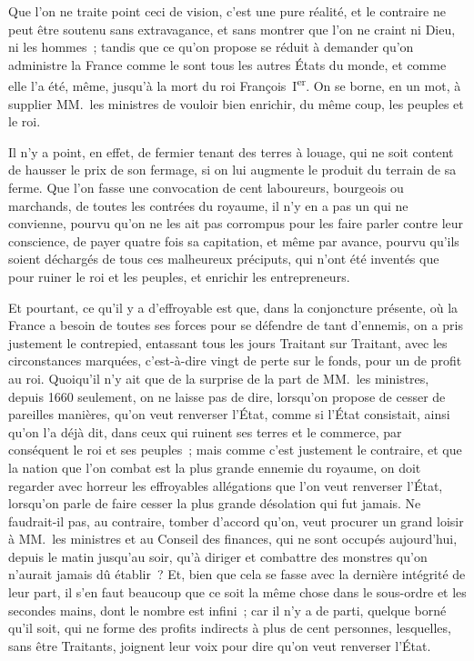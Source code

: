 \documentclass[french,twoside]{book} %
\begin{document}
Que l’on ne traite point ceci de vision, c’est une pure réalité, et le contraire ne peut être soutenu sans extravagance, et sans montrer que l’on ne craint ni Dieu, ni les hommes ; tandis que ce qu’on propose se réduit à demander qu’on administre la France comme le sont tous les autres États du monde, et comme elle l’a été, même, jusqu’à la mort du roi François I\textsuperscript{er}. On se borne, en un mot, à supplier MM. les ministres de vouloir bien enrichir, du même coup, les peuples et le roi.\par
Il n’y a point, en effet, de fermier tenant des terres à louage, qui ne soit content de hausser le prix de son fermage, si on lui augmente le produit du terrain de sa ferme. Que l’on fasse une convocation de cent laboureurs, bourgeois ou marchands, de toutes les contrées du royaume, il n’y en a pas un qui ne convienne, pourvu qu’on ne les ait pas corrompus pour les faire parler contre leur conscience, de payer quatre fois sa capitation, et même par avance, pourvu qu’ils soient déchargés de tous ces malheureux préciputs, qui n’ont été inventés que pour ruiner le roi et les peuples, et enrichir les entrepreneurs.\par
Et pourtant, ce qu’il y a d’effroyable est que, dans la conjoncture présente, où la France a besoin de toutes ses forces pour se défendre de tant d’ennemis, on a pris justement le contrepied, entassant tous les jours Traitant sur Traitant, avec les circonstances marquées, c’est-à-dire vingt de perte sur le fonds, pour un de profit au roi. Quoiqu’il n’y ait que de la surprise de la part de MM. les ministres, depuis 1660 seulement, on ne laisse pas de dire, lorsqu’on propose de cesser de pareilles manières, qu’on veut renverser l’État, comme si l’État consistait, ainsi qu’on l’a déjà dit, dans ceux qui ruinent ses terres et le commerce, par conséquent le roi et ses peuples ; mais comme c’est justement le contraire, et que la nation que l’on combat est la plus grande ennemie du royaume, on doit regarder avec horreur les effroyables allégations que l’on veut renverser l’État, lorsqu’on parle de faire cesser la plus grande désolation qui fut jamais. Ne faudrait-il pas, au contraire, tomber d’accord qu’on, veut procurer un grand loisir à MM. les ministres et au Conseil des finances, qui ne sont occupés aujourd’hui, depuis le matin jusqu’au soir, qu’à diriger et combattre des monstres qu’on n’aurait jamais dû établir ? Et, bien que cela se fasse avec la dernière intégrité de leur part, il s’en faut beaucoup que ce soit la même chose dans le sous-ordre et les secondes mains, dont le nombre est infini ; car il n’y a de parti, quelque borné qu’il soit, qui ne forme des profits indirects à plus de cent personnes, lesquelles, sans être Traitants, joignent leur voix pour dire qu’on veut renverser l’État.\par
\end{document}

